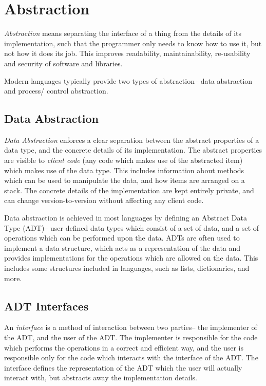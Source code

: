 
\section*{Abstraction}

\textit{Abstraction} means separating the interface of a thing from the details of its implementation, such that the
 programmer only needs to know how to use it, but not how it does its job. This improves readability, maintainability,
 re-usability and security of software and libraries.

Modern languages typically provide two types of abstraction-- data abstraction and process/ control abstraction.

\subsection*{Data Abstraction}

\textit{Data Abstraction} enforces a clear separation between the abstract properties of a data type, and the concrete
 details of its implementation. The abstract properties are visible to \textit{client code} (any code which makes use of
 the abstracted item) which makes use of the data type. This includes information about methods which can be used to
 manipulate the data, and how items are arranged on a stack. The concrete details of the implementation are kept entirely
 private, and can change version-to-version without affecting any client code.

Data abstraction is achieved in most languages by defining an Abstract Data Type (ADT)-- user defined data types which
 consist of a set of data, and a set of operations which can be performed upon the data. ADTs are often used to implement
 a data structure, which acts as a representation of the data and provides implementations for the operations which are
 allowed on the data. This includes some structures included in languages, such as lists, dictionaries, and more.

\subsection*{ADT Interfaces}

An \textit{interface} is a method of interaction between two parties-- the implementer of the ADT, and the user of the ADT.
 The implementer is responsible for the code which performs the operations in a correct and efficient way, and the user
 is responsible only for the code which interacts with the interface of the ADT. The interface defines the representation
 of the ADT which the user will actually interact with, but abstracts away the implementation details.

